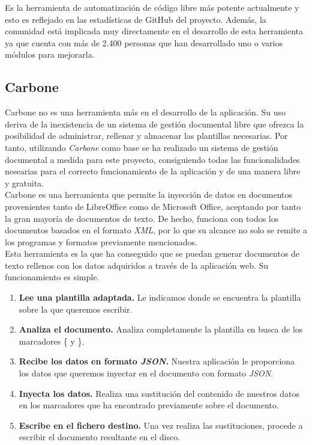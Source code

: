 Es la herramienta de automatización de código libre más potente actualmente y esto es reflejado
en las estadísticas de GitHub del proyecto. Además, la comunidad está implicada muy directamente
en el desarrollo de esta herramienta ya que cuenta con más de 2.400 personas que han desarrollado
uno o varios módulos para mejorarla.

\subsection{Carbone}
Carbone\cite{carbone} no es una herramienta más en el desarrollo de la aplicación. Su uso deriva de la inexistencia de un sistema de gestión documental libre que ofrezca la posibilidad de administrar, rellenar y almacenar las plantillas necesarias. Por tanto, utilizando \textit{Carbone} como base se ha realizado un sistema de gestión documental a medida para este proyecto, consiguiendo todas las funcionalidades nesearias para el correcto funcionamiento de la aplicación y de una manera libre y gratuita.\\

Carbone es una herramienta que permite la inyección de datos en documentos provenientes tanto de LibreOffice como de Microsoft Office, aceptando por tanto la gran mayoría de documentos de texto. De hecho, funciona con todos los documentos basados en el formato \textit{XML}, por lo que su alcance no solo se remite a los programas y formatos previamente mencionados.\\

Esta herramienta es la que ha conseguido que se puedan generar documentos de texto rellenos con los datos adquiridos a través de la aplicación web. Su funcionamiento es simple.\\

\begin{enumerate}
	\item \textbf{Lee una plantilla adaptada.} Le indicamos donde se encuentra la plantilla sobre la que queremos escribir. 
	\item \textbf{Analiza el documento.} Analiza completamente la plantilla en busca de los marcadores \{ y \}.  
	\item \textbf{Recibe los datos en formato \textit{JSON}.} Nuestra aplicación le proporciona los datos que queremos inyectar en el documento con formato \textit{JSON}.  
	\item \textbf{Inyecta los datos.} Realiza una sustitución del contenido de nuestros datos en los marcadores que ha encontrado previamente sobre el documento.
	\item \textbf{Escribe en el fichero destino.} Una vez realiza las sustituciones, procede a escribir el documento resultante en el disco. 
\end{enumerate}

